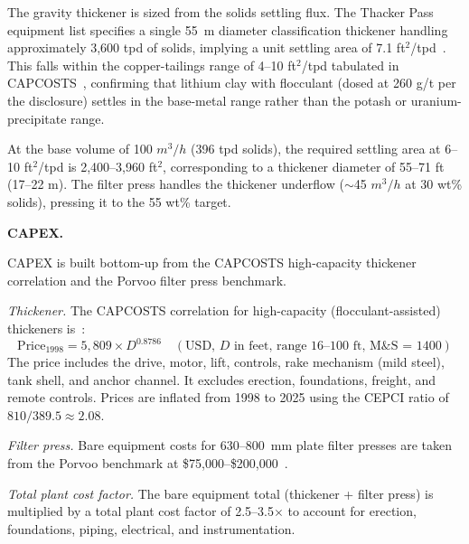 \documentclass{article}
\renewcommand\_{\textunderscore\allowbreak}
\begin{document}
The gravity thickener is sized from the solids settling flux. The Thacker Pass equipment list specifies a single 55~m diameter classification thickener handling approximately 3,600 tpd of solids, implying a unit settling area of 7.1 ft$^2$/tpd~\citep{sgscanadaincSK1300Technical2024}. This falls within the copper-tailings range of 4--10 ft$^2$/tpd tabulated in CAPCOSTS~\citep[p.~270]{mularCAPCOSTSHandbookEstimating1998}, confirming that lithium clay with flocculant (dosed at 260 g/t per the disclosure) settles in the base-metal range rather than the potash or uranium-precipitate range.

At the base volume of 100 $\si{m^3/h}$ (396 tpd solids), the required settling area at 6--10 ft$^2$/tpd is 2,400--3,960 ft$^2$, corresponding to a thickener diameter of 55--71 ft (17--22 m). The filter press handles the thickener underflow ($\sim$45 $\si{m^3/h}$ at 30 wt\% solids), pressing it to the 55 wt\% target.

\medskip
\noindent\textbf{CAPEX.}\quad

CAPEX is built bottom-up from the CAPCOSTS high-capacity thickener correlation and the Porvoo filter press benchmark.

\textit{Thickener.} The CAPCOSTS correlation for high-capacity (flocculant-assisted) thickeners is~\citep[Figure~190, p.~271]{mularCAPCOSTSHandbookEstimating1998}:
\[
	\text{Price}_{\text{1998}} = 5,809 \times D^{0.8786} \quad (\text{USD, } D \text{ in feet, range 16--100 ft, M\&S = 1400})
\]
The price includes the drive, motor, lift, controls, rake mechanism (mild steel), tank shell, and anchor channel. It excludes erection, foundations, freight, and remote controls. Prices are inflated from 1998 to 2025 using the CEPCI ratio of $810/389.5 \approx 2.08$.

\textit{Filter press.} Bare equipment costs for 630--800~mm plate filter presses are taken from the Porvoo benchmark at \$75,000--\$200,000~\citep{porvooIndustrialFilterPress2025}.

\textit{Total plant cost factor.} The bare equipment total (thickener + filter press) is multiplied by a total plant cost factor of 2.5--3.5$\times$ to account for erection, foundations, piping, electrical, and instrumentation.
\end{document}
